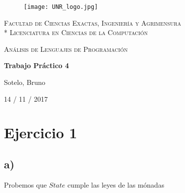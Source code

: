 \documentclass[a4paper]{report}
\begin{document}
\begin{titlepage}
\centering
\begin{figure}[H]
    \begin{center}
        \texttt{[image: UNR\_logo.jpg]}
    \end{center}
\end{figure}
{\scshape\large Facultad de Ciencias Exactas, Ingenier\'ia y Agrimensura\\*
                 Licenciatura en Ciencias de la Computaci\'on\par}
\vspace{5cm}
{\scshape\LARGE An\'alisis de Lenguajes de Programaci\'on \par}
{\huge\bfseries Trabajo Pr\'actico 4 \par}
\vspace{3cm}
{\Large Sotelo, Bruno\par}
\vfill
{\large 14  / 11 / 2017 \par}
\end{titlepage}

\section*{Ejercicio 1}
\subsection*{a)}
Probemos que $State$ cumple las leyes de las m\'onadas
\end{document}
